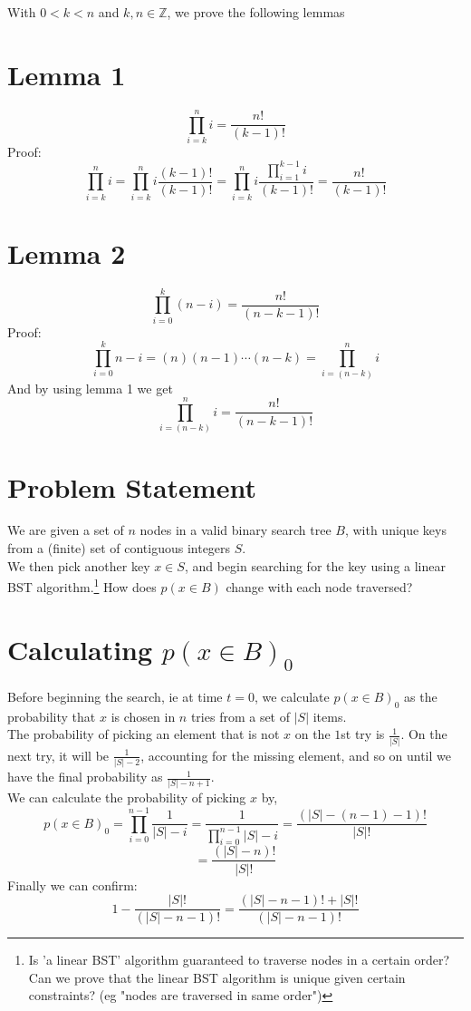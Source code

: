 \documentclass[10pt,a4paper]{article}
\author{Christian Burke}
\begin{document}
With $0 < k < n$ and $k,n \in \mathbb{Z}$, we prove the following lemmas
\section*{Lemma 1}
$$ \prod_{i=k}^n i = \frac{n!}{(k-1)!}$$
Proof:
$$ \prod_{i=k}^n i = \prod_{i=k}^{n} i \frac{(k-1)!}{(k-1)!}
 = \prod_{i=k}^n i \frac{\prod_{i=1}^{k-1} i}{(k-1)!}
 = \frac{n!}{(k-1)!}$$
\section*{Lemma 2}
$$ \prod_{i=0}^k (n-i) = \frac{n!}{(n-k-1)!}$$
Proof:
$$ \prod_{i=0}^k n-i = (n)(n-1)\cdots(n-k) = \prod_{i=(n-k)}^n i$$
And by using lemma 1 we get
$$ \prod_{i=(n-k)}^n i = \frac{n!}{(n-k-1)!}$$
\section*{Problem Statement}
We are given a set of $n$ nodes in a valid binary search tree $B$, with unique keys from a (finite) set of contiguous integers $S$.\\
We then pick another key $x \in S$, and begin searching for the key using a linear BST algorithm.\footnote{Is 'a linear BST' algorithm guaranteed to traverse nodes in a certain order? Can we prove that the linear BST algorithm is unique given certain constraints? (eg "nodes are traversed in same order")}
How does $p(x \in B)$ change with each node traversed?\\
\section*{Calculating $p(x \in B)_0$}
Before beginning the search, ie at time $t=0$, we calculate $p(x \in B)_0$ as the probability that $x$ is chosen in $n$ tries from a set of $|S|$ items.\\
The probability of picking an element that is not $x$ on the $1$st try is $\frac{1}{|S|}$. On the next try, it will be $\frac{1}{|S|-2}$, accounting for the missing element, and so on until we have the final probability as $\frac{1}{|S|- n + 1}$.\\
We can calculate the probability of picking $x$ by,
$$p(x \in B)_0
=\prod_{i=0}^{n-1}\frac{1}{ |S| - i}
=\frac{1}{\prod_{i=0}^{n-1} |S| - i}
= \frac{(|S|-(n-1)-1)!}{|S|!}$$
$$ = \frac{(|S|- n)!}{|S|!} $$
Finally we can confirm:
$$1 - \frac{|S|!}{(|S|-n-1)!} = \frac{(|S|-n-1)! + |S|!}{(|S|-n-1)!}$$
\end{document}
